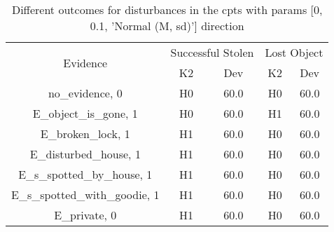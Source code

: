 \begin{table}\begin{tabular}{c|cc|cc}\toprule\multirow{2}{*}{Evidence} & \multicolumn{2}{c}{Successful Stolen} & \multicolumn{2}{c}{Lost Object} \\& {K2} & {Dev} & {K2} & {Dev} \\\midrule
no\_evidence, 0 & \cellcolor{Bittersweet}H0&\cellcolor{Bittersweet}60.0&\cellcolor{Bittersweet}H0&\cellcolor{Bittersweet}60.0\\E\_object\_is\_gone, 1 & \cellcolor{Bittersweet}H0&\cellcolor{Bittersweet}60.0&\cellcolor{Bittersweet}H1&\cellcolor{Bittersweet}60.0\\E\_broken\_lock, 1 & \cellcolor{Bittersweet}H1&\cellcolor{Bittersweet}60.0&\cellcolor{Bittersweet}H0&\cellcolor{Bittersweet}60.0\\E\_disturbed\_house, 1 & \cellcolor{Bittersweet}H1&\cellcolor{Bittersweet}60.0&\cellcolor{Bittersweet}H0&\cellcolor{Bittersweet}60.0\\E\_s\_spotted\_by\_house, 1 & \cellcolor{Bittersweet}H1&\cellcolor{Bittersweet}60.0&\cellcolor{Bittersweet}H0&\cellcolor{Bittersweet}60.0\\E\_s\_spotted\_with\_goodie, 1 & \cellcolor{Bittersweet}H1&\cellcolor{Bittersweet}60.0&\cellcolor{Bittersweet}H0&\cellcolor{Bittersweet}60.0\\E\_private, 0 & \cellcolor{Bittersweet}H1&\cellcolor{Bittersweet}60.0&\cellcolor{Bittersweet}H0&\cellcolor{Bittersweet}60.0\\\bottomrule\end{tabular}\caption{Different outcomes for disturbances in the cpts with params [0, 0.1, 'Normal (M, sd)'] direction}\end{table}